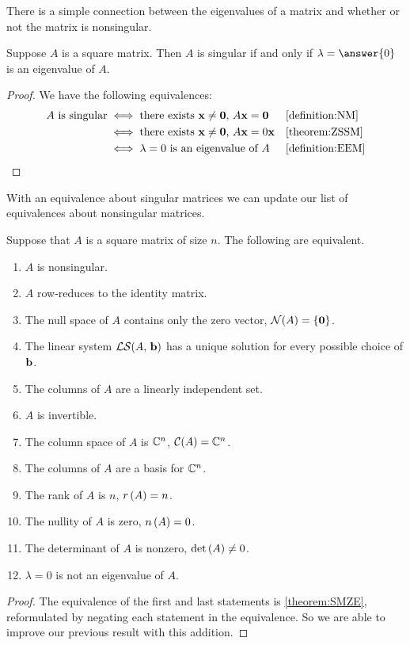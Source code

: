 \documentclass{ximera}
\begin{document}
There is a simple connection between the eigenvalues of a matrix and whether or not the matrix is nonsingular.

\begin{theorem}
\label{theorem:SMZE}

Suppose $A$ is a square matrix.  Then $A$ is singular if and only if
$\lambda=\answer{0}$ is an eigenvalue of $A$.

\begin{proof}
  We have the following equivalences:
  \begin{align*}
    \text{$A$ is singular}&\iff\text{there exists $\mathbf{x}\neq\mathbf{0}$, $A\mathbf{x}=\mathbf{0}$}&&\ref{definition:NM}\\
                          &\iff\text{there exists $\mathbf{x}\neq\mathbf{0}$, $A\mathbf{x}=0\mathbf{x}$}&&\ref{theorem:ZSSM}\\
                          &\iff\text{$\lambda=0$ is an eigenvalue of $A$}&&\ref{definition:EEM}
\end{align*}

\end{proof}
\end{theorem}

With an equivalence about singular matrices we can update our list of equivalences about nonsingular matrices.

\begin{theorem}
Suppose that $A$ is a square matrix of size $n$.  The following are equivalent.
\begin{enumerate}\item $A$ is nonsingular.
\item $A$ row-reduces to the identity matrix.
\item The null space of $A$ contains only the zero vector, $\mathcal{N}\!\left(A\right)=\left\{\mathbf{0}\right\}$.
\item The linear system $\mathcal{LS}\!\left(A,\,\mathbf{b}\right)$ has a unique solution for every possible choice of $\mathbf{b}$.
\item The columns of $A$ are a linearly independent set.
\item $A$ is invertible.
\item The column space of $A$ is $\mathbb{C}^{n}$, $\mathcal{C}\!\left(A\right)=\mathbb{C}^{n}$.
\item The columns of $A$ are a basis for $\mathbb{C}^{n}$.
\item The rank of $A$ is $n$, $r\left(A\right)=n$.
\item The nullity of $A$ is zero, $n\left(A\right)=0$.
\item The determinant of $A$ is nonzero, $\det\left(A\right)\neq 0$.
\item $\lambda=0$ is not an eigenvalue of $A$.
\end{enumerate}

\begin{proof}
  The equivalence of the first and last statements is
  \ref{theorem:SMZE}, reformulated by negating each statement in the
  equivalence.  So we are able to improve our previous result with
  this addition.
\end{proof}
\end{theorem}
\end{document}
